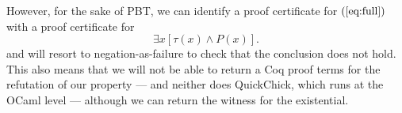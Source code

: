 %
However, for the sake of PBT, we can identify a proof certificate for
$(\ref{eq:full})$ with a proof certificate for
\[
  \exists x [\tau(x)\wedge P(x)].
  \tag{**}\label{eq:short}
\]
and will resort to negation-as-failure to check that the conclusion does not hold. This also means that we will not be able to return a Coq proof terms for the refutation of our property --- and neither does \textsf{QuickChick}, which runs at the OCaml level --- although we can return the witness for the existential.
%


